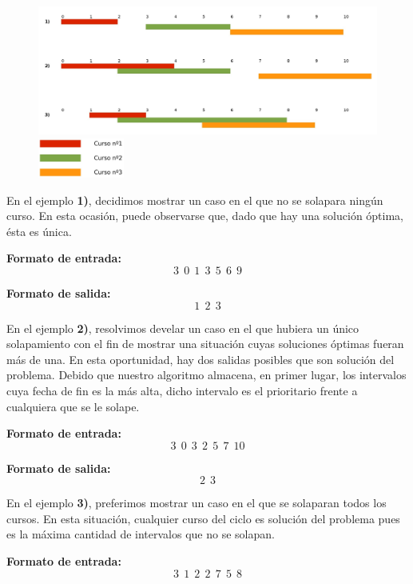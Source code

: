 \begin{figure}[H] %
\begin{center}
\includegraphics[width=450pt]{../imgs/ejemplosej2.jpg}
\end{center}
\includegraphics[width=80pt]{../imgs/leyendaejemploej2.jpg}
\end{figure}
En el ejemplo \textbf{1)}, decidimos mostrar un caso en el que no se solapara ningún curso. En esta ocasión, puede observarse que, dado que hay una solución óptima, ésta es única.\newline

\textbf{Formato de entrada:}
$$3\ \ 0\ \ 1\ \ 3\ \ 5\ \ 6\ \ 9$$

\textbf{Formato de salida:}
$$1\ \ 2\ \ 3$$

En el ejemplo \textbf{2)}, resolvimos develar un caso en el que hubiera un único solapamiento con el fin de mostrar una situación cuyas soluciones óptimas fueran más de una. En esta oportunidad, hay dos salidas posibles que son solución del problema. Debido que nuestro algoritmo almacena, en primer lugar, los intervalos cuya fecha de fin es la más alta, dicho intervalo es el prioritario frente a cualquiera que se le solape.\newline

\textbf{Formato de entrada:}
$$3\ \ 0\ \ 3\ \ 2\ \ 5\ \ 7\ \ 10$$

\textbf{Formato de salida:}
$$2\ \ 3$$

En el ejemplo \textbf{3)}, preferimos mostrar un caso en el que se solaparan todos los cursos. En esta situación, cualquier curso del ciclo es solución del problema pues es la máxima cantidad de intervalos que no se solapan.\newline

\textbf{Formato de entrada:}
$$3\ \ 1\ \ 2\ \ 2\ \ 7\ \ 5\ \ 8$$

